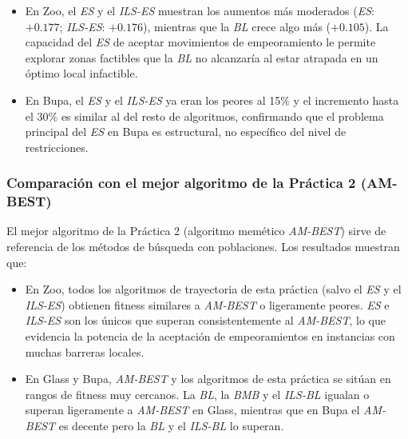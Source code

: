 \documentclass[12pt]{article}
\begin{document}
\begin{itemize}
    \item En {Zoo}, el \textit{ES} y el \textit{ILS-ES} muestran los aumentos más moderados (\textit{ES}:
    $+0.177$; \textit{ILS-ES}: $+0.176$), mientras que la \textit{BL} crece algo más ($+0.105$).  La
    capacidad del \textit{ES} de aceptar movimientos de empeoramiento le permite explorar zonas
    factibles que la \textit{BL} no alcanzaría al estar atrapada en un óptimo local infactible.
 
    \item En {Bupa}, el \textit{ES} y el \textit{ILS-ES} ya eran los peores al 15\% y el
    incremento hasta el 30\% es similar al del resto de algoritmos, confirmando que
    el problema principal del \textit{ES} en Bupa es estructural, no específico del nivel de
    restricciones.
\end{itemize}
 
\subsubsection*{Comparación con el mejor algoritmo de la Práctica 2 (AM-BEST)}
 
El mejor algoritmo de la Práctica 2 (algoritmo memético \textit{AM-BEST}) sirve de referencia
de los métodos de búsqueda con poblaciones. Los resultados muestran que:
 
\begin{itemize}
    \item En {Zoo}, todos los algoritmos de trayectoria de esta práctica (salvo
    el \textit{ES} y el \textit{ILS-ES}) obtienen fitness similares a \textit{AM-BEST} o ligeramente peores.  \textit{ES} e
    \textit{ILS-ES} son los únicos que superan consistentemente al \textit{AM-BEST}, lo que evidencia la
    potencia de la aceptación de empeoramientos en instancias con muchas barreras locales.
 
    \item En {Glass} y {Bupa}, \textit{AM-BEST} y los algoritmos de esta práctica
    se sitúan en rangos de fitness muy cercanos.  La \textit{BL}, la \textit{BMB} y el \textit{ILS-BL} igualan o
    superan ligeramente a \textit{AM-BEST} en Glass, mientras que en Bupa el \textit{AM-BEST} es decente
    pero la \textit{BL} y el \textit{ILS-BL} lo superan.
\end{itemize}
 
\end{document}
